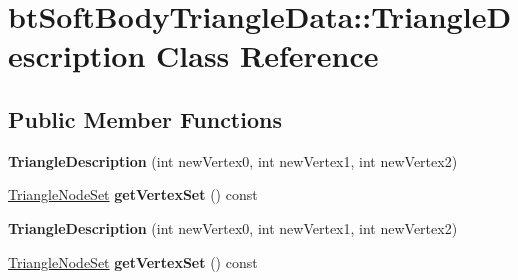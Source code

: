 \hypertarget{classbtSoftBodyTriangleData_1_1TriangleDescription}{}\section{bt\+Soft\+Body\+Triangle\+Data\+:\+:Triangle\+Description Class Reference}
\label{classbtSoftBodyTriangleData_1_1TriangleDescription}
\subsection*{Public Member Functions}
\begin{DoxyCompactItemize}
\item 
\mbox{\label{classbtSoftBodyTriangleData_1_1TriangleDescription_a9badc65b91d151ab2286c75742a95a6b}} 
{\bfseries Triangle\+Description} (int new\+Vertex0, int new\+Vertex1, int new\+Vertex2)
\item 
\mbox{\label{classbtSoftBodyTriangleData_1_1TriangleDescription_a7bc6cced3c429b6b11de8dc3f6d540eb}} 
\hyperlink{classbtSoftBodyTriangleData_1_1TriangleNodeSet}{Triangle\+Node\+Set} {\bfseries get\+Vertex\+Set} () const
\item 
\mbox{\label{classbtSoftBodyTriangleData_1_1TriangleDescription_a9badc65b91d151ab2286c75742a95a6b}} 
{\bfseries Triangle\+Description} (int new\+Vertex0, int new\+Vertex1, int new\+Vertex2)
\item 
\mbox{\label{classbtSoftBodyTriangleData_1_1TriangleDescription_a7bc6cced3c429b6b11de8dc3f6d540eb}} 
\hyperlink{classbtSoftBodyTriangleData_1_1TriangleNodeSet}{Triangle\+Node\+Set} {\bfseries get\+Vertex\+Set} () const
\end{DoxyCompactItemize}

